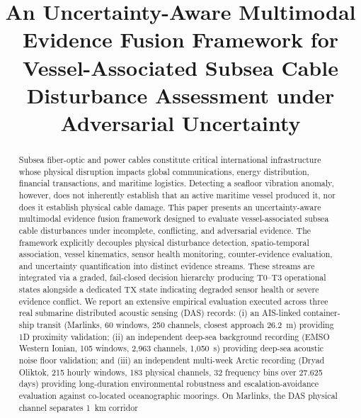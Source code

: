 \documentclass[conference]{IEEEtran}
\newcommand{\dstate}[1]{\ensuremath{\mathrm{#1}}}
\begin{document}
\title{An Uncertainty-Aware Multimodal Evidence Fusion
Framework for Vessel-Associated Subsea Cable Disturbance
Assessment under Adversarial Uncertainty}

\author{
}

\maketitle

\begin{abstract}
Subsea fiber-optic and power cables constitute critical international
infrastructure whose physical disruption impacts global communications, energy
distribution, financial transactions, and maritime logistics. Detecting a
seafloor vibration anomaly, however, does not inherently establish that an
active maritime vessel produced it, nor does it establish physical cable
damage. This paper presents an uncertainty-aware multimodal evidence fusion
framework designed to evaluate vessel-associated subsea cable disturbances under
incomplete, conflicting, and adversarial evidence. The framework explicitly
decouples physical disturbance detection, spatio-temporal association, vessel
kinematics, sensor health monitoring, counter-evidence evaluation, and
uncertainty quantification into distinct evidence streams. These streams are
integrated via a graded, fail-closed decision hierarchy producing
\dstate{T0}--\dstate{T3} operational states alongside a dedicated \dstate{TX}
state indicating degraded sensor health or severe evidence conflict. We report
an extensive empirical evaluation executed across three real submarine
distributed acoustic sensing (DAS) records: (i) an AIS-linked container-ship
transit (Marlinks, 60 windows, 250 channels, closest approach 26.2~m)
providing 1D proximity validation; (ii) an independent deep-sea background
recording (EMSO Western Ionian, 105 windows, 2,963 channels, 1,050~s) providing
deep-sea acoustic noise floor validation; and (iii) an independent multi-week
Arctic recording (Dryad Oliktok, 215 hourly windows, 183 physical channels, 32
frequency bins over 27.625 days) providing long-duration environmental
robustness and escalation-avoidance evaluation against co-located oceanographic
moorings. On Marlinks, the DAS physical channel separates 1~km corridor

\end{abstract}
\end{document}
